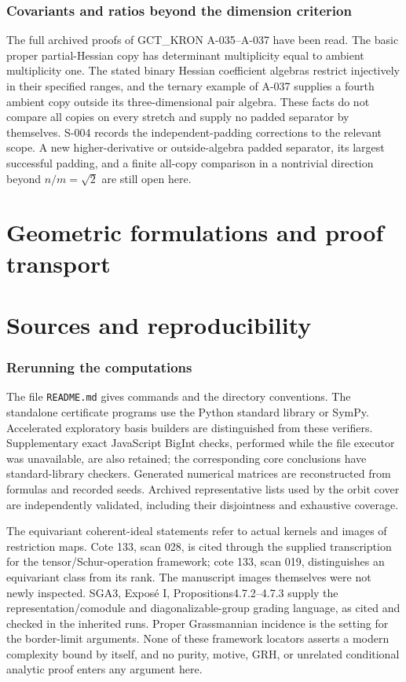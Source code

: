 \documentclass[11pt]{article}
\begin{document}
\section{Covariants and ratios beyond the dimension criterion}
The full archived proofs of GCT\_KRON A-035--A-037 have been read.
The basic proper partial-Hessian copy has determinant multiplicity
equal to ambient multiplicity one. The stated binary Hessian coefficient
algebras restrict injectively in their specified ranges, and the
ternary example of A-037 supplies a fourth ambient copy outside its
three-dimensional pair algebra. These facts do not compare all copies
on every stretch and supply no padded separator by themselves.
S-004 records the independent-padding corrections to the relevant
scope. A new higher-derivative or outside-algebra padded separator,
its largest successful padding, and a finite all-copy comparison in
a nontrivial direction beyond $n/m=\sqrt2$ are still open here.

\part{Geometric formulations and proof transport}


\part{Sources and reproducibility}

\section{Rerunning the computations}
The file \texttt{README.md} gives commands and the directory conventions.
The standalone certificate programs use the Python standard library
or SymPy. Accelerated exploratory basis builders are distinguished
from these verifiers. Supplementary exact JavaScript BigInt checks,
performed while the file executor was unavailable, are also retained;
the corresponding core conclusions have standard-library checkers.
Generated numerical matrices are
reconstructed from formulas and recorded seeds. Archived representative
lists used by the orbit cover are independently validated, including
their disjointness and exhaustive coverage.

The equivariant coherent-ideal statements refer to actual kernels and
images of restriction maps. Cote 133, scan 028, is cited through the
supplied transcription for the tensor/Schur-operation framework;
cote 133, scan 019, distinguishes an equivariant class from its rank.
The manuscript images themselves were not newly inspected. SGA3,
Expos\'e I, Propositions4.7.2--4.7.3 supply the representation/comodule
and diagonalizable-group grading language, as cited and checked in the
inherited runs. Proper Grassmannian incidence is the setting for the
border-limit arguments. None of these framework locators asserts a
modern complexity bound by itself, and no purity, motive, GRH, or
unrelated conditional analytic proof enters any argument here.
\end{document}

